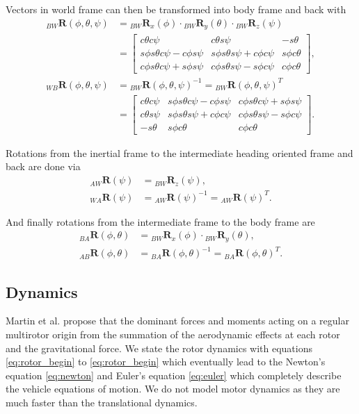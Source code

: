 Vectors in world frame can then be transformed into body frame and back with
\begin{align}
_{BW}\mathbf{R} (\phi,\theta,\psi) &= {_{BW}\mathbf{R}_x} (\phi) \cdot {_{BW}\mathbf{R}_y} (\theta) \cdot {_{BW}\mathbf{R}_z} (\psi) \\
&=
 \begin{bmatrix}
c\theta c\psi 				&c\theta s\psi 				& -s\theta  \\
s\phi s\theta c\psi - c\phi s\psi  	& s\phi s\theta s\psi + c\phi c\psi 	& s\phi c\theta \\
c\phi s\theta c\psi + s\phi s\psi	& c\phi s\theta s\psi - s\phi c\psi 	& c\phi c\theta
\end{bmatrix} ,\\
_{WB}\mathbf{R} (\phi,\theta,\psi) &= {_{BW}\mathbf{R} (\phi,\theta,\psi)}^{-1} = {_{BW}\mathbf{R} (\phi,\theta,\psi)}^{T} \\
&=
\begin{bmatrix}
c\theta c\psi & s\phi s\theta c\psi - c\phi s\psi & c\phi s\theta c\psi + s\phi s\psi \\
c\theta s\psi & s\phi s\theta s\psi + c\phi c\psi & c\phi s\theta s\psi - s\phi c\psi \\
-s\theta & s\phi c\theta & c\phi c\theta
\end{bmatrix}.
\end{align}

Rotations from the inertial frame to the intermediate heading oriented frame and back are done via
\begin{align}
_{AW}\mathbf{R} (\psi) &= {_{BW}\mathbf{R}_z} (\psi) ,\\
_{WA}\mathbf{R} (\psi) &= {_{AW}\mathbf{R} (\psi)}^{-1} = {_{AW}\mathbf{R} (\psi)}^{T}.
\end{align}

And finally rotations from the intermediate frame to the body frame are
\begin{align}
_{BA}\mathbf{R} (\phi,\theta) &= {_{BW}\mathbf{R}_x} (\phi) \cdot {_{BW}\mathbf{R}_y} (\theta)  ,\\
_{AB}\mathbf{R} (\phi,\theta) &= {_{BA}\mathbf{R} (\phi,\theta)}^{-1} = {_{BA}\mathbf{R} (\phi,\theta)}^{T}.
\end{align}


\subsection{Dynamics}
\label{sec:dynamics}
Martin et al. \cite{Martin2010} propose that the dominant forces and moments acting on a regular multirotor origin from the summation of the aerodynamic effects at each rotor and the gravitational force. We state the rotor dynamics with equations \ref{eq:rotor_begin} to \ref{eq:rotor_begin} which eventually lead to the Newton's equation \ref{eq:newton} and Euler's equation \ref{eq:euler} which completely describe the vehicle equations of motion. We do not model motor dynamics as they are much faster than the translational dynamics.

